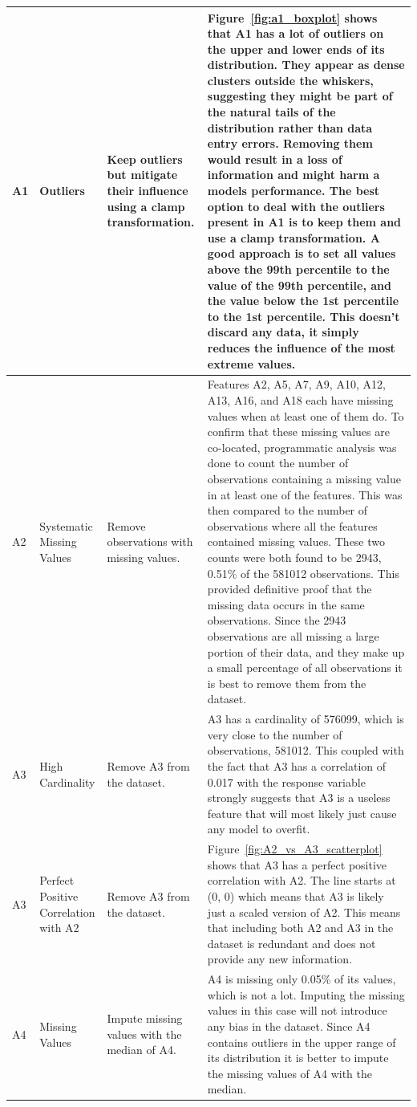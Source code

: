 \documentclass[11pt]{report}
\begin{document}
\begin{longtable}{p{2cm}p{3cm}p{4cm}p{6cm}}
A1 & Outliers & Keep outliers but mitigate their influence using a clamp transformation. & Figure~\ref{fig:a1_boxplot} shows that A1 has a lot of outliers on the upper and lower ends of its distribution. They appear as dense clusters outside the whiskers, suggesting they might be part of the natural tails of the distribution rather than data entry errors. Removing them would result in a loss of information and might harm a models performance. The best option to deal with the outliers present in A1 is to keep them and use a clamp transformation. A good approach is to set all values above the 99th percentile to the value of the 99th percentile, and the value below the 1st percentile to the 1st percentile. This doesn't discard any data, it simply reduces the influence of the most extreme values. \\
\midrule
A2 & Systematic Missing Values & Remove observations with missing values. & Features A2, A5, A7, A9, A10, A12, A13, A16, and A18 each have missing values when at least one of them do. To confirm that these missing values are co-located, programmatic analysis was done to count the number of observations containing a missing value in at least one of the features. This was then compared to the number of observations where all the features contained missing values. These two counts were both found to be 2943, 0.51\% of the 581012 observations. This provided definitive proof that the missing data occurs in the same observations. Since the 2943 observations are all missing a large portion of their data, and they make up a small percentage of all observations it is best to remove them from the dataset. \\
\midrule
A3 & High Cardinality & Remove A3 from the dataset. & A3 has a cardinality of 576099, which is very close to the number of observations, 581012. This coupled with the fact that A3 has a correlation of 0.017 with the response variable strongly suggests that A3 is a useless feature that will most likely just cause any model to overfit.\\
\midrule
A3 & Perfect Positive Correlation with A2 & Remove A3 from the dataset. & Figure~\ref{fig:A2_vs_A3_scatterplot} shows that A3 has a perfect positive correlation with A2. The line starts at (0, 0) which means that A3 is likely just a scaled version of A2. This means that including both A2 and A3 in the dataset is redundant and does not provide any new information. \\
\midrule
A4 & Missing Values & Impute missing values with the median of A4. & A4 is missing only 0.05\% of its values, which is not a lot. Imputing the missing values in this case will not introduce any bias in the dataset. Since A4 contains outliers in the upper range of its distribution it is better to impute the missing values of A4 with the median. \\

\end{longtable}
\end{document}

